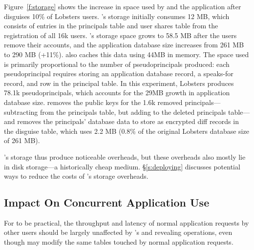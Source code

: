 %
Figure~\ref{f:storage} shows the increase in space used by \sys and the
application after \sys disguises 10\% of Lobsters users. \sys's storage
initially consumes 12 MB, which consists of entries in the principals table and
user shares table from the registration of all 16k users.
%
\sys's storage space grows to 58.5 MB after the users remove their accounts, and
the application database size increases from 261 MB to 290 MB (+11\%).
%
\sys also caches this data using 44MB in memory.
%
The space used is primarily proportional to the number of pseudoprincipals
produced: each pseudoprincipal requires storing an application database record,
a speaks-for record, and row in the principal table.
%
In this experiment, Lobsters produces 78.1k pseudoprincipals, which accounts for
the 29MB growth in application database size.
%
%
%
%
\sys removes the public keys for the 1.6k removed principals---subtracting from
the principals table, but adding to the deleted principals table---and removes
the principals' database data to store as encrypted diff records in the disguise
table, which uses 2.2 MB (0.8\% of the original Lobsters database size of 261
MB).
%

\sys's storage thus produce noticeable overheads, but these overheads also
mostly lie in disk storage---a historically cheap medium.  \S\ref{s:deploying}
discusses potential ways to reduce the costs of \sys's storage overheads.
%

\subsection{Impact On Concurrent Application Use}
\label{s:eval-conc}

%
%
%
For \sys to be practical, the throughput and latency of normal application
requests by other users should be largely unaffected by \sys's \xxing and
revealing operations, even though \sys may modify the same tables touched by
normal application requests.
%
%

